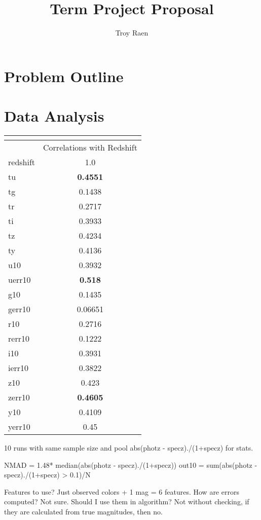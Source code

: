 \documentclass[13pt]{amsart}
\title{Term Project Proposal}
\author{Troy Raen}
\begin{document}
\maketitle



\section{Problem Outline}


\section{Data Analysis}


\begin{center}
\begin{tabular}{|l|c|}
\multicolumn{2}{c}{} \\ \hline 
 & Correlations with Redshift \\ \hline
redshift & 1.0 \\ \hline
tu & \textbf{0.4551} \\ \hline
tg & 0.1438 \\ \hline
tr & 0.2717 \\ \hline
ti & 0.3933 \\ \hline
tz & 0.4234 \\ \hline
ty & 0.4136 \\ \hline
u10 & 0.3932 \\ \hline
uerr10 & \textbf{0.518} \\ \hline
g10 & 0.1435 \\ \hline
gerr10 & 0.06651 \\ \hline
r10 & 0.2716 \\ \hline
rerr10 & 0.1222 \\ \hline
i10 & 0.3931 \\ \hline
ierr10 & 0.3822 \\ \hline
z10 & 0.423 \\ \hline
zerr10 & \textbf{0.4605} \\ \hline
y10 & 0.4109 \\ \hline
yerr10 & 0.45 \\ \hline
\end{tabular}
\end{center}

10 runs with same sample size and pool abs(photz - specz)./(1+specz) for stats.

NMAD = 1.48* median(abs(photz - specz)./(1+specz))
out10 = sum(abs(photz - specz)./(1+specz) > 0.1)/N


Features to use? Just observed colors + 1 mag = 6 features.
How are errors computed? Not sure. Should I use them in algorithm? Not without checking, if they are calculated from true magnitudes, then no.
\end{document}
